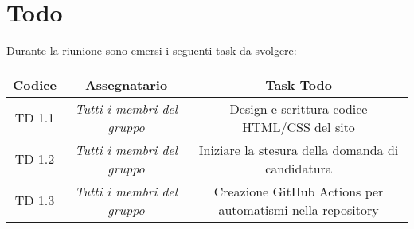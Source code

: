 \section{Todo}

Durante la riunione sono emersi i seguenti task da svolgere:

\vspace{0.5cm}

\begin{table}[htbp]
	\begin{tabular}{|c|c|c|}
		\hline
		\rowcolor[gray]{0.9}
		Codice & Assegnatario & Task Todo \\
		\hline
		TD 1.1 & \it{Tutti i membri del gruppo} & Design e scrittura codice HTML/CSS del sito\\
		\hline
		TD 1.2 & \it{Tutti i membri del gruppo} & Iniziare la stesura della domanda di candidatura \\
		\hline
		TD 1.3 & \it{Tutti i membri del gruppo} & Creazione GitHub Actions per automatismi nella repository \\
		\hline
	\end{tabular}
\end{table}